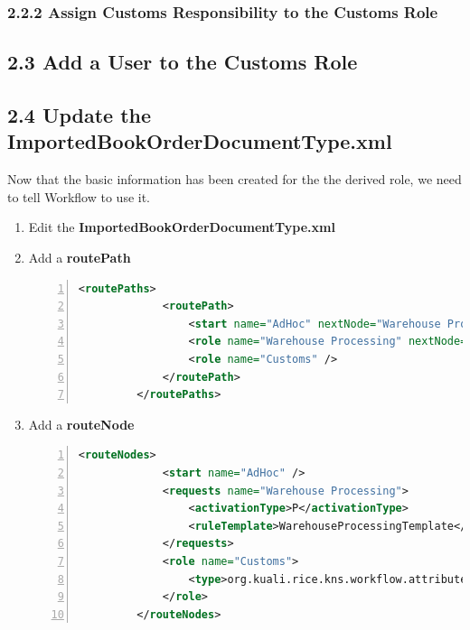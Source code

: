 \subsubsection*{2.2.2 Assign Customs Responsibility to the Customs Role}

\subsection*{2.3 Add a User to the Customs Role}

\subsection*{2.4 Update the ImportedBookOrderDocumentType.xml}
Now that the basic information has been created for the the derived
role, we need to tell Workflow to use it.

\begin{enumerate}
  \item Edit the \textbf{ImportedBookOrderDocumentType.xml}
  \item Add a \textbf{routePath}
\begin{lstlisting}[numbers=left,language=xml,basicstyle=\scriptsize,backgroundcolor=\color{ubergray},caption={ImportBookOrderDocument.xml},frame=single,breaklines=true]
   		 <routePaths>
   			 <routePath>
   				 <start name="AdHoc" nextNode="Warehouse Processing" />
   				 <role name="Warehouse Processing" nextNode="Customs" />
   				 <role name="Customs" />
   			 </routePath>
   		 </routePaths>
\end{lstlisting}
\item Add a \textbf{routeNode}
\begin{lstlisting}[numbers=left,language=xml,basicstyle=\scriptsize,backgroundcolor=\color{ubergray},caption={ImportBookOrderDocument.xml},frame=single,breaklines=true]
   		 <routeNodes>
   			 <start name="AdHoc" />
   			 <requests name="Warehouse Processing">
   				 <activationType>P</activationType>
   				 <ruleTemplate>WarehouseProcessingTemplate</ruleTemplate>
   			 </requests>
   			 <role name="Customs">
   				 <type>org.kuali.rice.kns.workflow.attribute.DataDictionaryQualifierResolver</type>
   			 </role>
   		 </routeNodes>
\end{lstlisting}
\end{enumerate}

